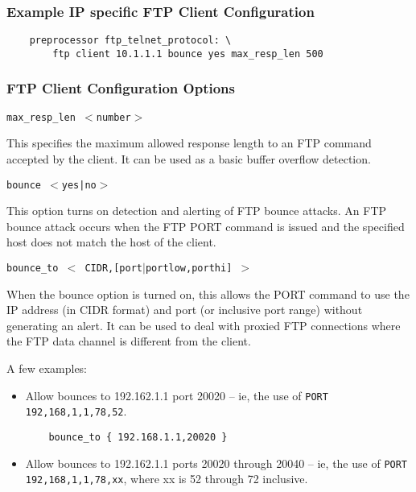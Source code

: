 \documentclass[english]{report}
\newcounter{slistnum}
\newenvironment{slist}
{ \begin{list}{ {\bf \arabic{slistnum}.} }{\usecounter{slistnum} } }
{ \end{list} }
\begin{document}
\subsubsection{Example IP specific FTP Client Configuration}

\begin{verbatim}
    preprocessor ftp_telnet_protocol: \
        ftp client 10.1.1.1 bounce yes max_resp_len 500
\end{verbatim}

\subsubsection{FTP Client Configuration Options}

\begin{slist}
\item \texttt{max\_resp\_len $<$number$>$}

This specifies the maximum allowed response length to an FTP command accepted
by the client.  It can be used as a basic buffer overflow detection.

\item \texttt{bounce $<$yes|no$>$}

This option turns on detection and alerting of FTP bounce attacks.  An FTP
bounce attack occurs when the FTP PORT command is issued and the specified host
does not match the host of the client.

\item \texttt{bounce\_to $<$ CIDR,[port$|$portlow,porthi] $>$}

When the bounce option is turned on, this allows the PORT command to use the IP
address (in CIDR format) and port (or inclusive port range) without generating
an alert.  It can be used to deal with proxied FTP connections where the FTP
data channel is different from the client.

A few examples:

\begin{itemize}
\item Allow bounces to 192.162.1.1 port 20020 -- ie, the use of
\texttt{PORT 192,168,1,1,78,52}.

\begin{verbatim}
    bounce_to { 192.168.1.1,20020 }
\end{verbatim}

\item Allow bounces to 192.162.1.1 ports 20020 through 20040 -- ie, the use of
\texttt{PORT 192,168,1,1,78,xx}, where xx is 52 through 72 inclusive.


\end{itemize}
\end{slist}
\end{document}
